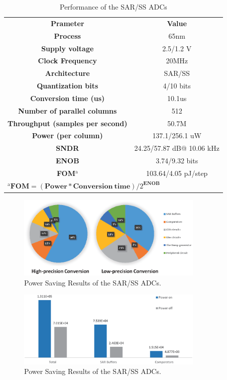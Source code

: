\documentclass[conference]{IEEEtran}
\begin{document}
\begin{table}[htbp]
	\caption{Performance of the SAR/SS ADCs}
	\begin{center}
		\begin{tabular}{|c|c|}
			\hline
			\textbf{Prameter}& \textbf{Value} \\
			\hhline{|==|}
			\textbf{Process}& 65nm \\
			\hline 
			\textbf{Supply voltage}& 2.5/1.2 V \\
			\hline
			\textbf{Clock Frequency}&	20MHz \\
			\hline
			\textbf{Architecture}&	SAR/SS \\
			\hline
			\textbf{Quantization bits}&	4/10 bits \\
			\hline
			\textbf{Conversion time (us)}&	10.1us \\
			\hline
			\textbf{Number of parallel columns}&	512 \\
			\hline
			\textbf{Throughput (samples per second)}&	50.7M \\ 
			\hline
			\textbf{Power (per column)}&	137.1/256.1 uW \\
			\hline
			\textbf{SNDR}& 24.25/57.87 dB@ 10.06 kHz \\
			\hline
			\textbf{ENOB}& 3.74/9.32 bits \\
			\hline
			\textbf{FOM$^{\mathrm{a}}$}& 103.64/4.05 pJ/step\\
			\hline
			\multicolumn{2}{l}{$^{\mathrm{a}}\textbf{FOM}=(\textbf{Power}\ast \textbf{Conversion}\ \textbf{time})/2^{\textbf{ENOB}}$ }	    
		\end{tabular}
		\label{tab2}
	\end{center}
\end{table}

\begin{figure}[htbp]
	\centerline{\includegraphics[width=3.5in]{./Figures/SARResults1.eps}}
	\caption{Power Saving Results of the SAR/SS ADCs.}
	\label{SARresults1}
\end{figure} 

\begin{figure}[htbp]
	\centerline{\includegraphics[width=3.5in]{./Figures/SARResults2.eps}}
	\caption{Power Saving Results of the SAR/SS ADCs.}
	\label{SARresults2}
\end{figure} 
\end{document}
